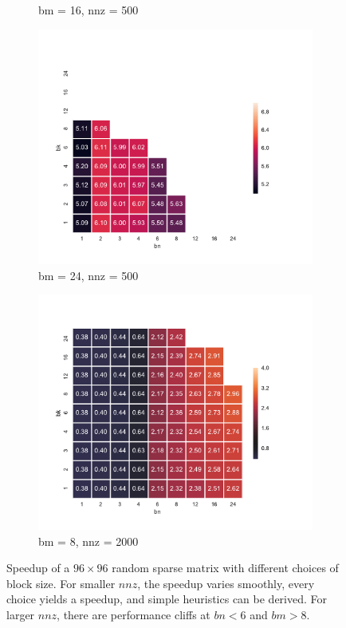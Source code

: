 \begin{figure}[H]
\begin{subfigure}[b]{0.45\textwidth}
      \caption{bm = 16, nnz = 500}
    \end{subfigure}
    \begin{subfigure}[b]{0.45\textwidth}
      \centering
      \includegraphics[width=\textwidth]{images/unrolled_sizing_500_24.pdf}
      \caption{bm = 24, nnz = 500}
    \end{subfigure}
    \begin{subfigure}[b]{0.45\textwidth}
      \centering
      \includegraphics[width=\textwidth]{images/unrolled_sizing_2000_8.pdf}
      \caption{bm = 8, nnz = 2000}
    \end{subfigure}
    \caption{Speedup of a $96 \times 96$ random sparse matrix with different choices of block size. For smaller $nnz$, the speedup varies smoothly, every choice yields a speedup, and simple heuristics can be derived. For larger $nnz$, there are performance cliffs at $bn < 6$ and $bm > 8$.}
    \label{fig:unrolled_sizing}
  \end{figure}



